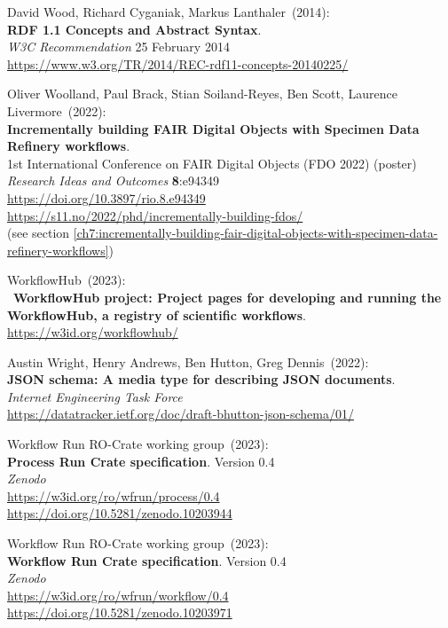 \begin{thebibliography}{9}
David Wood, Richard Cyganiak, Markus Lanthaler~(2014): \\
\textbf{RDF 1.1 Concepts and Abstract Syntax}.\\
\emph{W3C Recommendation} 25 February 2014\\
\url{https://www.w3.org/TR/2014/REC-rdf11-concepts-20140225/}

Oliver Woolland, Paul Brack, Stian Soiland-Reyes, Ben Scott, Laurence Livermore~(2022): \\
\textbf{Incrementally building FAIR Digital Objects with Specimen Data Refinery workflows}.\\
1st International Conference on FAIR Digital Objects
(FDO 2022) (poster)\\
\emph{Research Ideas and Outcomes} \textbf{8}:e94349\\
\url{https://doi.org/10.3897/rio.8.e94349}\\
\url{https://s11.no/2022/phd/incrementally-building-fdos/}\\
(see section \vref{ch7:incrementally-building-fair-digital-objects-with-specimen-data-refinery-workflows})

WorkflowHub~(2023): \\
~\textbf{WorkflowHub project: Project pages for developing and running the WorkflowHub, a registry of scientific workflows}.\\
\url{https://w3id.org/workflowhub/}

Austin Wright, Henry Andrews, Ben Hutton, Greg Dennis~(2022): \\
\textbf{JSON schema: A media type for describing JSON documents}.\\
\emph{Internet Engineering Task Force}\\
\url{https://datatracker.ietf.org/doc/draft-bhutton-json-schema/01/}

Workflow Run RO-Crate working group~(2023): \\
\textbf{Process Run Crate specification}. Version 0.4\\
\emph{Zenodo}\\
\url{https://w3id.org/ro/wfrun/process/0.4}\\
\url{https://doi.org/10.5281/zenodo.10203944}

Workflow Run RO-Crate working group~(2023): \\
\textbf{Workflow Run Crate specification}. Version 0.4\\
\emph{Zenodo}\\
\url{https://w3id.org/ro/wfrun/workflow/0.4}\\
\url{https://doi.org/10.5281/zenodo.10203971}


\end{thebibliography}
